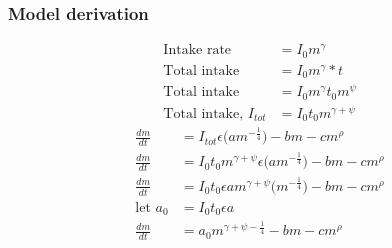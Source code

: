 \documentclass[handout]{beamer}
\begin{document}
\begin{frame}
	\small
	\frametitle{Model derivation}
	\begin{align*}
		\text{Intake rate} &= I_{0}m^{\gamma} \\
		\text{Total intake} &= I_{0}m^{\gamma}*t \\
		\text{Total intake} &= I_{0}m^{\gamma}t_{0}m^{\psi} \\
		\text{Total intake, } I_{tot} &= I_{0}t_{0}m^{\gamma + \psi}
	\end{align*}
	\begin{align*}
		\frac{dm}{dt} &= I_{tot}\epsilon\Big(am^{-\frac{1}{4}}\Big) - bm - cm^{\rho} \\
		\frac{dm}{dt} &= I_{0}t_{0}m^{\gamma + \psi}\epsilon\Big(am^{-\frac{1}{4}}\Big) - bm - cm^{\rho} \\
		\frac{dm}{dt} &= I_{0}t_{0}\epsilon am^{\gamma + \psi}\Big(m^{-\frac{1}{4}}\Big) - bm - cm^{\rho} \\
		\text{let } a_0 &= I_{0}t_{0}\epsilon a \\
		\frac{dm}{dt} &= a_{0}m^{\gamma + \psi -\frac{1}{4}} - bm - cm^{\rho} \\
	\end{align*}
\end{frame}
\end{document}
